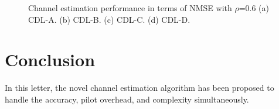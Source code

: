 \documentclass[lettersize,journal]{IEEEtran}
\begin{document}
\begin{figure}[!t]
\centering
{}
\hfil
{}
\caption{Channel estimation performance in terms of NMSE with $\rho$=0.6 (a) CDL-A. (b) CDL-B. (c) CDL-C. (d) CDL-D.}
\label{fig_sim}
\end{figure}

\section{Conclusion}


In this letter, the novel channel estimation algorithm has been proposed to handle the accuracy, pilot overhead, and complexity simultaneously.



% 

\end{document}
